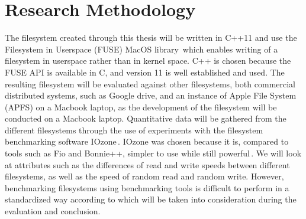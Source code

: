 
\section{Research Methodology}%

The filesystem created through this thesis will be written in C++11 and use the Filesystem in Userspace (FUSE) MacOS library\,\cite{HomeMacFUSE} which enables writing of a filesystem in userspace rather than in kernel space. C++ is chosen because the FUSE API is available in C, and version 11 is well established and used. The resulting filesystem will be evaluated against other filesystems, both commercial distributed systems, such as Google drive, and an instance of Apple File System (APFS)\cite{appleAppleFileSystem} on a Macbook laptop, as the development of the filesystem will be conducted on a Macbook laptop. Quantitative data will be gathered from the different filesystems through the use of experiments with the filesystem benchmarking software IOzone\,\cite{IozoneFilesystemBenchmark}. IOzone was chosen because it is, compared to tools such as Fio and Bonnie++, simpler to use while still powerful\,\cite{agarwalComparingIOBenchmarks2018}. We will look at attributes such as the differences of read and write speeds between different filesystems, as well as the speed of random read and random write. However, benchmarking filesystems using benchmarking tools is difficult to perform in a standardized way according to \citeauthor{tarasovBenchmarkingFileSystem2011}\cite{tarasovBenchmarkingFileSystem2011} which will be taken into consideration during the evaluation and conclusion.